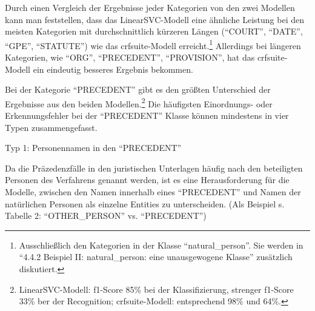 \documentclass[paper=A4, ngerman, fontsize=12pt]{article}
\begin{document}
	\indent
	Durch einen Vergleich der Ergebnisse jeder Kategorien von den zwei Modellen kann man feststellen, dass das LinearSVC-Modell eine ähnliche Leistung bei den meisten Kategorien mit durchschnittlich kürzeren Längen (\enquote{COURT}, \enquote{DATE}, \enquote{GPE}, \enquote{STATUTE}) wie das crfsuite-Modell erreicht.\footnote{Ausschließlich den Kategorien in der Klasse \enquote{natural\_person}. Sie werden in \enquote{4.4.2 Beispiel II: natural\_person: eine unausgewogene Klasse} zusätzlich diskutiert.} Allerdings bei längeren Kategorien, wie \enquote{ORG}, \enquote{PRECEDENT}, \enquote{PROVISION}, hat das crfsuite-Modell ein eindeutig besseres Ergebnis bekommen. 
	
	\indent
	Bei der Kategorie \enquote{PRECEDENT} gibt es den größten Unterschied der Ergebnisse aus den beiden Modellen.\footnote{LinearSVC-Modell: f1-Score 85\% bei der Klassifizierung, strenger f1-Score 33\% ber der Recognition; crfsuite-Modell: entsprechend 98\% und 64\%.} Die häufigsten Einordnungs- oder Erkennungsfehler bei der \enquote{PRECEDENT} Klasse können mindestens in vier Typen zusammengefasst. 
	
	\medskip
	\indent
	Typ 1: Personennamen in den \enquote{PRECEDENT}
	
	\indent
	Da die Präzedenzfälle in den juristischen Unterlagen häufig nach den beteiligten Personen des Verfahrens genannt werden, ist es eine Herausforderung für die Modelle, zwischen den Namen innerhalb eines \enquote{PRECEDENT} und Namen der natürlichen Personen als einzelne Entities zu unterscheiden. (Als Beispiel s. Tabelle 2: \enquote{OTHER\_PERSON} vs. \enquote{PRECEDENT})
	
\end{document}

